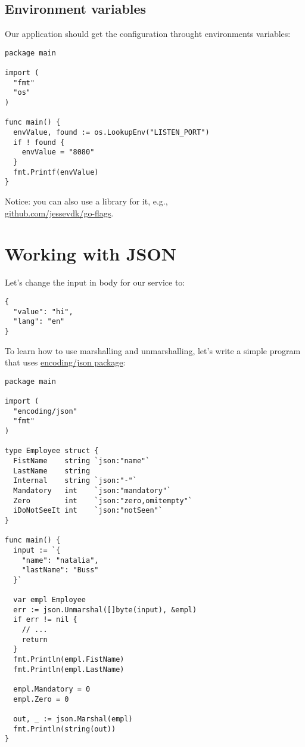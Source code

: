 \documentclass[11pt, letterpaper]{article}
\begin{document}
\subsection{Environment variables}

Our application should get the configuration throught environments variables:

\begin{verbatim}
package main

import (
  "fmt"
  "os"
)

func main() {
  envValue, found := os.LookupEnv("LISTEN_PORT")
  if ! found {
    envValue = "8080"
  }
  fmt.Printf(envValue)
}
\end{verbatim}
\bigskip
Notice: you can also use a library for it, e.g.,\\ \href{https://github.com/jessevdk/go-flags}{github.com/jessevdk/go-flags}.

\section{Working with JSON}

Let's change the input in body for our service to:

\begin{verbatim}
{
  "value": "hi",
  "lang": "en"
}
\end{verbatim}

To learn how to use marshalling and unmarshalling, let's write a simple program that uses \href{https://golang.org/pkg/encoding/json/}{encoding/json package}:

\begin{verbatim}
package main

import (
  "encoding/json"
  "fmt"
)

type Employee struct {
  FistName    string `json:"name"`
  LastName    string
  Internal    string `json:"-"`
  Mandatory   int    `json:"mandatory"`
  Zero        int    `json:"zero,omitempty"`
  iDoNotSeeIt int    `json:"notSeen"`
}

func main() {
  input := `{
    "name": "natalia",
    "lastName": "Buss"
  }`

  var empl Employee
  err := json.Unmarshal([]byte(input), &empl)
  if err != nil {
    // ...
    return
  }
  fmt.Println(empl.FistName)
  fmt.Println(empl.LastName)

  empl.Mandatory = 0
  empl.Zero = 0

  out, _ := json.Marshal(empl)
  fmt.Println(string(out))
}
\end{verbatim}
\end{document}
